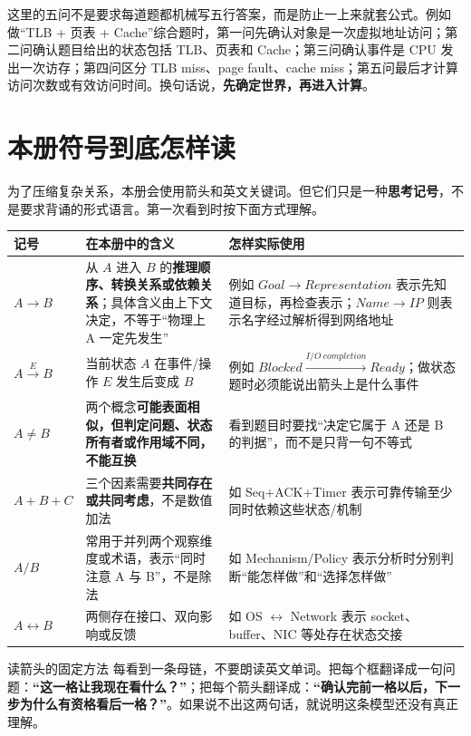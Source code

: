 \documentclass[11pt,a4paper,openany]{ctexbook}
\newcommand{\key}[1]{\textbf{\color{deep}#1}}
\begin{document}
这里的五问不是要求每道题都机械写五行答案，而是防止一上来就套公式。例如做“TLB + 页表 + Cache”综合题时，第一问先确认对象是一次虚拟地址访问；第二问确认题目给出的状态包括 TLB、页表和 Cache；第三问确认事件是 CPU 发出一次访存；第四问区分 TLB miss、page fault、cache miss；第五问最后才计算访问次数或有效访问时间。换句话说，\key{先确定世界，再进入计算}。

\section{本册符号到底怎样读}
为了压缩复杂关系，本册会使用箭头和英文关键词。但它们只是一种\key{思考记号}，不是要求背诵的形式语言。第一次看到时按下面方式理解。

\begin{longtable}{L{3.0cm}L{5.1cm}L{\dimexpr\linewidth-9.37cm\relax}}
\toprule
\textbf{记号} & \textbf{在本册中的含义} & \textbf{怎样实际使用}\\
\midrule
$A\rightarrow B$ & 从 $A$ 进入 $B$ 的\key{推理顺序、转换关系或依赖关系}；具体含义由上下文决定，不等于“物理上 A 一定先发生” & 例如 $Goal\rightarrow Representation$ 表示先知道目标，再检查表示；$Name\rightarrow IP$ 则表示名字经过解析得到网络地址 \\
\midrule
$A\xrightarrow{E}B$ & 当前状态 $A$ 在事件/操作 $E$ 发生后变成 $B$ & 例如 $Blocked\xrightarrow{I/O\ completion}Ready$；做状态题时必须能说出箭头上是什么事件 \\
\midrule
$A\neq B$ & 两个概念\key{可能表面相似，但判定问题、状态所有者或作用域不同，不能互换} & 看到题目时要找“决定它属于 A 还是 B 的判据”，而不是只背一句不等式 \\
\midrule
$A+B+C$ & 三个因素需要\key{共同存在或共同考虑}，不是数值加法 & 如 Seq+ACK+Timer 表示可靠传输至少同时依赖这些状态/机制 \\
\midrule
$A/B$ & 常用于并列两个观察维度或术语，表示“同时注意 A 与 B”，不是除法 & 如 Mechanism/Policy 表示分析时分别判断“能怎样做”和“选择怎样做” \\
\midrule
$A\leftrightarrow B$ & 两侧存在接口、双向影响或反馈 & 如 OS $\leftrightarrow$ Network 表示 socket、buffer、NIC 等处存在状态交接 \\
\bottomrule
\end{longtable}

\begin{methodbox}{读箭头的固定方法}
每看到一条母链，不要朗读英文单词。把每个框翻译成一句问题：\textbf{“这一格让我现在看什么？”}；把每个箭头翻译成：\textbf{“确认完前一格以后，下一步为什么有资格看后一格？”}。如果说不出这两句话，就说明这条模型还没有真正理解。
\end{methodbox}
\end{document}
